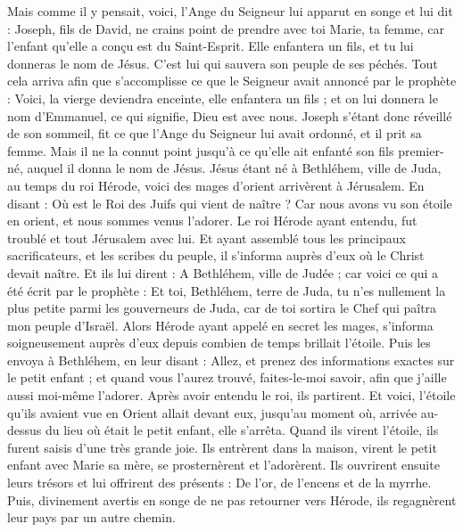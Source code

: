 \begin{multicols}{2}
Mais comme il y pensait, voici, l'Ange du Seigneur lui apparut en songe et lui dit : Joseph, fils de David, ne crains point de prendre avec toi Marie, ta femme, car l’enfant qu’elle a conçu est du Saint-Esprit.
Elle enfantera un fils, et tu lui donneras le nom de Jésus. C’est lui qui sauvera son peuple de ses péchés.
Tout cela arriva afin que s’accomplisse ce que le Seigneur avait annoncé par le prophète :
Voici, la vierge deviendra enceinte, elle enfantera un fils ; et on lui donnera le nom d’Emmanuel, ce qui signifie, Dieu est avec nous.
Joseph s’étant donc réveillé de son sommeil, fit ce que l'Ange du Seigneur lui avait ordonné, et il prit sa femme.
Mais il ne la connut point jusqu'à ce qu'elle ait enfanté son fils premier-né, auquel il donna le nom de Jésus.
\VerseOne{}Jésus étant né à Bethléhem, ville de Juda, au temps du roi Hérode, voici des mages d'orient arrivèrent à Jérusalem.
En disant : Où est le Roi des Juifs qui vient de naître ? Car nous avons vu son étoile en orient, et nous sommes venus l'adorer.
Le roi Hérode ayant entendu, fut troublé et tout Jérusalem avec lui.
Et ayant assemblé tous les principaux sacrificateurs, et les scribes du peuple, il s'informa auprès d'eux où le Christ devait naître.
Et ils lui dirent : A Bethléhem, ville de Judée ; car voici ce qui a été écrit par le prophète :
Et toi, Bethléhem, terre de Juda, tu n'es nullement la plus petite parmi les gouverneurs de Juda, car de toi sortira le Chef qui paîtra mon peuple d'Israël.
Alors Hérode ayant appelé en secret les mages, s'informa soigneusement auprès d’eux depuis combien de temps brillait l'étoile.
Puis les envoya à Bethléhem, en leur disant : Allez, et prenez des informations exactes sur le petit enfant ; et quand vous l'aurez trouvé, faites-le-moi savoir, afin que j’aille aussi moi-même l’adorer.
Après avoir entendu le roi, ils partirent. Et voici, l'étoile qu'ils avaient vue en Orient allait devant eux, jusqu’au moment où, arrivée au-dessus du lieu où était le petit enfant, elle s’arrêta.
Quand ils virent l'étoile, ils furent saisis d’une très grande joie.
Ils entrèrent dans la maison, virent le petit enfant avec Marie sa mère, se prosternèrent et l’adorèrent. Ils ouvrirent ensuite leurs trésors et lui offrirent des présents : De l'or, de l'encens et de la myrrhe.
Puis, divinement avertis en songe de ne pas retourner vers Hérode, ils regagnèrent leur pays par un autre chemin.

\end{multicols}
